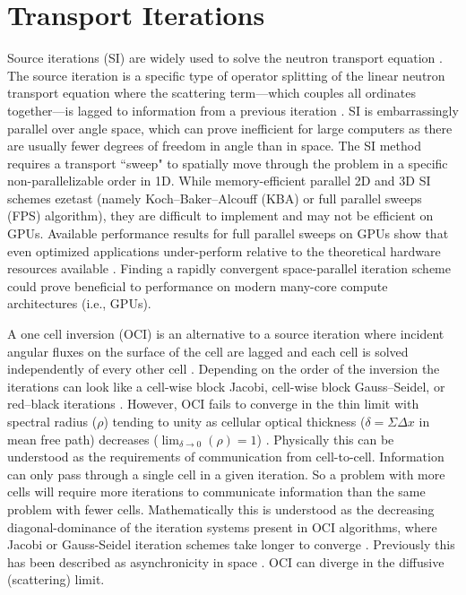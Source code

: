 \section{Transport Iterations}

Source iterations (SI) are widely used to solve the \sn neutron transport equation \cite{adams_fast_2002}.
The source iteration is a specific type of operator splitting of the linear neutron transport equation where the scattering term---which couples all \sn ordinates together---is lagged to information from a previous iteration \cite{lewis_computational_1984}.
SI is embarrassingly parallel over angle space, which can prove inefficient for large computers as there are usually fewer degrees of freedom in angle than in space.
The SI method requires a transport ``sweep" to spatially move through the problem in a specific non-parallelizable order in 1D.
While memory-efficient parallel 2D and 3D SI schemes ezetast (namely Koch--Baker--Alcouff (KBA) or full parallel sweeps (FPS) \cite{baker_computational_2017, baker_kba_2017, alcouffe_time-dependent_1998} algorithm), they are difficult to implement and may not be efficient on GPUs.
Available performance results for full parallel sweeps on GPUs show that even optimized applications under-perform relative to the theoretical hardware resources available \cite{Thomas_2024_profiling, wolfe2022roofline, kunen_kripke_2015, zerr_partisn_2019}.
Finding a rapidly convergent space-parallel iteration scheme could prove beneficial to performance on modern many-core compute architectures (i.e., GPUs).

A one cell inversion (OCI) is an alternative to a source iteration where incident angular fluxes on the surface of the cell are lagged and each cell is solved independently of every other cell \cite{rosa_cellwise_2013, adams_fast_2002}.
Depending on the order of the inversion the iterations can look like a cell-wise block Jacobi, cell-wise block Gauss--Seidel, or red--black iterations \cite{man1994parallel}.
However, OCI fails to converge in the thin limit with spectral radius ($\rho$) tending to unity as cellular optical thickness ($\delta=\Sigma\Delta x$ in mean free path) decreases ($\lim_{\delta\rightarrow0}(\rho) = 1$) \cite{tsa_slab2006rosa}.
Physically this can be understood as the requirements of communication from cell-to-cell.
Information can only pass through a single cell in a given iteration.
So a problem with more cells will require more iterations to communicate information than the same problem with fewer cells.
Mathematically this is understood as the decreasing diagonal-dominance of the iteration systems present in OCI algorithms, where Jacobi or Gauss-Seidel iteration schemes take longer to converge \cite{isaacson_numerical_1966}.
Previously this has been described as asynchronicity in space \cite{hoagland_hybrid_2021}.
OCI can diverge in the diffusive (scattering) limit.


